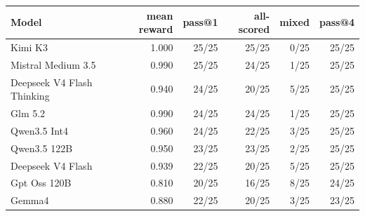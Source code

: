 \begin{tabular}{lrrrrr}
\toprule
Model & mean reward & pass@1 & all-scored & mixed & pass@4 \\
\midrule
Kimi K3 & 1.000 & 25/25 & 25/25 & 0/25 & 25/25 \\
Mistral Medium 3.5 & 0.990 & 25/25 & 24/25 & 1/25 & 25/25 \\
Deepseek V4 Flash Thinking & 0.940 & 24/25 & 20/25 & 5/25 & 25/25 \\
Glm 5.2 & 0.990 & 24/25 & 24/25 & 1/25 & 25/25 \\
Qwen3.5 Int4 & 0.960 & 24/25 & 22/25 & 3/25 & 25/25 \\
Qwen3.5 122B & 0.950 & 23/25 & 23/25 & 2/25 & 25/25 \\
Deepseek V4 Flash & 0.939 & 22/25 & 20/25 & 5/25 & 25/25 \\
Gpt Oss 120B & 0.810 & 20/25 & 16/25 & 8/25 & 24/25 \\
Gemma4 & 0.880 & 22/25 & 20/25 & 3/25 & 23/25 \\
\bottomrule
\end{tabular}
